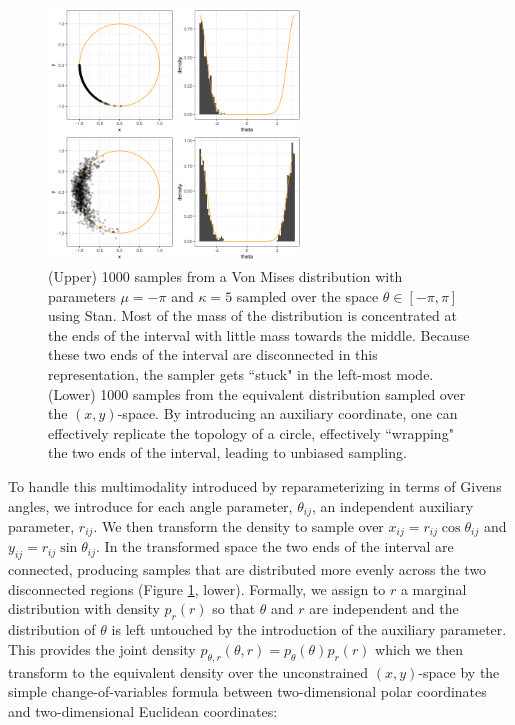 \documentclass[ba]{imsart}
\numberwithin{equation}{section}
\theoremstyle{plain}
\begin{document}
\begin{figure}[h]
\centering
\vspace{.1in}
\includegraphics[width=0.6\textwidth]{figures/donut.png}
\vspace{.05in}
\caption{(Upper) 1000 samples from a Von Mises distribution with parameters $\mu = -\pi$ and $\kappa = 5$ sampled over the space $\theta \in [-\pi, \pi]$ using Stan. Most of the mass of the distribution is concentrated at the ends of the interval with little mass towards the middle. Because these two ends of the interval are disconnected in this representation, the sampler gets ``stuck" in the left-most mode. (Lower) 1000 samples from the equivalent distribution sampled over the $(x,y)$-space. By introducing an auxiliary coordinate, one can effectively replicate the topology of a circle, effectively ``wrapping" the two ends of the interval, leading to unbiased sampling.}
\label{fig:donut}
\end{figure}

\noindent To handle this multimodality introduced by reparameterizing in terms of Givens angles, we introduce for each angle parameter, $\theta_{ij}$, an independent auxiliary parameter, $r_{ij}$. We then transform the density to sample over $x_{ij} = r_{ij} \cos \theta_{ij}$ and $y_{ij} = r_{ij} \sin \theta_{ij}$. In the transformed space the two ends of the interval are connected, producing samples that are distributed more evenly across the two disconnected regions (Figure \ref{fig:donut}, lower). Formally, we assign to $r$ a marginal distribution with density $p_r(r)$ so that $\theta$ and $r$ are independent and the distribution of $\theta$ is left untouched by the introduction of the auxiliary parameter. This provides the joint density $p_{\theta, r}(\theta, r) = p_\theta(\theta) p_r(r)$ which we then transform to the equivalent density over the unconstrained $(x,y)$-space by the simple change-of-variables formula between two-dimensional polar coordinates and two-dimensional Euclidean coordinates:
\end{document}
